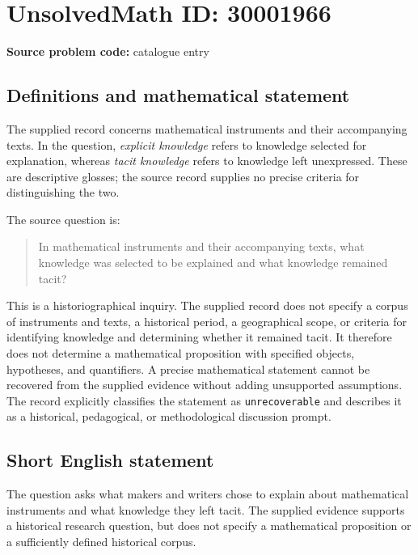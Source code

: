 \documentclass[11pt]{article}
\begin{document}
\section*{UnsolvedMath ID: 30001966}
\textbf{Source problem code:} catalogue entry
\subsection{Definitions and mathematical statement}
The supplied record concerns mathematical instruments and their accompanying texts. In the question, \emph{explicit knowledge} refers to knowledge selected for explanation, whereas \emph{tacit knowledge} refers to knowledge left unexpressed. These are descriptive glosses; the source record supplies no precise criteria for distinguishing the two.

The source question is:
\begin{quote}
In mathematical instruments and their accompanying texts, what knowledge was selected to be explained and what knowledge remained tacit?
\end{quote}

This is a historiographical inquiry. The supplied record does not specify a corpus of instruments and texts, a historical period, a geographical scope, or criteria for identifying knowledge and determining whether it remained tacit. It therefore does not determine a mathematical proposition with specified objects, hypotheses, and quantifiers. A precise mathematical statement cannot be recovered from the supplied evidence without adding unsupported assumptions. The record explicitly classifies the statement as \texttt{unrecoverable} and describes it as a historical, pedagogical, or methodological discussion prompt.
\subsection{Short English statement}
The question asks what makers and writers chose to explain about mathematical instruments and what knowledge they left tacit. The supplied evidence supports a historical research question, but does not specify a mathematical proposition or a sufficiently defined historical corpus.
\end{document}
